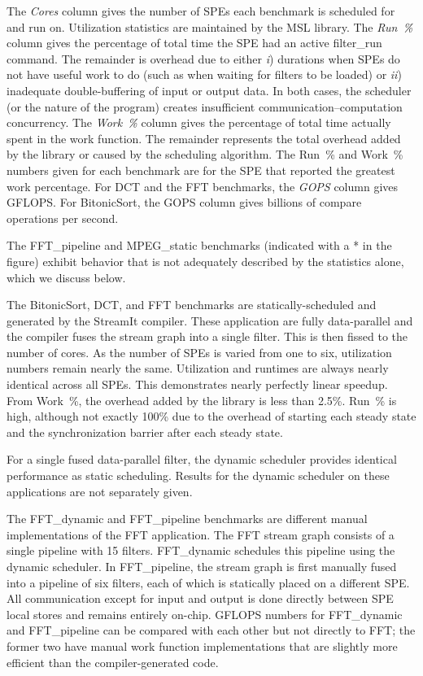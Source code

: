 The \emph{Cores} column gives the number of SPEs each benchmark is
scheduled for and run on. Utilization statistics are maintained by the
MSL library. The \emph{Run~\%} column gives the percentage of total time the SPE had an active \textsf{filter\_run} command. The remainder is overhead due to either \emph{i}) durations when SPEs do not have useful work to do (such as when waiting for filters to be loaded) or \emph{ii}) inadequate double-buffering of input or output data. In both cases, the scheduler (or the nature of the program) creates insufficient communication--computation concurrency. The \emph{Work~\%} column gives the percentage of total time actually spent in the work function. The remainder represents the total overhead added by the library or caused by the scheduling algorithm.
The Run~\% and Work~\% numbers given for each benchmark are for the SPE
that reported the greatest work percentage.
For \textsf{DCT} and the FFT benchmarks, the \emph{GOPS} column gives GFLOPS.
For \textsf{BitonicSort}, the GOPS column gives billions of
compare operations per second.

The \textsf{FFT\_pipeline} and \textsf{MPEG\_static} benchmarks (indicated
with a \textsf{*} in the figure) exhibit behavior that is not adequately
described by the statistics alone, which we discuss below.

The \textsf{BitonicSort}, \textsf{DCT}, and \textsf{FFT} benchmarks are statically-scheduled and generated by the StreamIt compiler. These application are fully data-parallel and the compiler fuses the stream graph into a single filter. This is then fissed to the number of cores. 
As the number of SPEs is varied from one to six, utilization numbers remain nearly the same. Utilization and runtimes are always nearly identical across all SPEs. This demonstrates nearly perfectly linear speedup.
From Work~\%, the overhead added by the library is less than 2.5\%. Run~\% is high, although not exactly 100\% due to the overhead of starting each steady state and the synchronization barrier after each steady state.

For a single fused data-parallel filter, the dynamic scheduler provides identical performance as static scheduling. Results for the dynamic scheduler on these applications are not separately given.

The \textsf{FFT\_dynamic} and \textsf{FFT\_pipeline} benchmarks are different manual implementations of the FFT application. The FFT stream graph consists of a single pipeline with 15 filters. \textsf{FFT\_dynamic} schedules this pipeline using the dynamic scheduler. In \textsf{FFT\_pipeline}, the stream graph is first manually fused into a pipeline of six filters, each of which is statically placed on a different SPE. All communication except for input and output is done directly between SPE local stores and remains entirely on-chip. GFLOPS numbers for \textsf{FFT\_dynamic} and \textsf{FFT\_pipeline} can be compared with each other but not directly to \textsf{FFT}; the former two have manual work function implementations that are slightly more efficient than the compiler-generated code.

